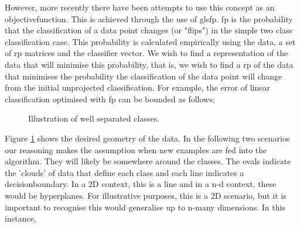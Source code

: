 However, more recently there have been attempts to use this concept as an \gls{objectivefunction}. This is achieved through the use of gls{fp}. \gls{fp} is the probability that the classification of a data point changes (or "flips") in the simple two class classification case. This probability is calculated empirically using the data, a set of \gls{rp} matrices and the classifier vector. We wish to find a representation of the data that will minimise this probability, that is, we wish to find a \gls{rp} of the data that minimises the probability the classification of the data point will change from the initial unprojected classification.  For example, the error of linear classification optimised with \gls{fp} can be bounded as follows;

\begin{figure}[ht]
\caption{Illustration of well separated classes.} 
\label{fig:good_sep_classes} %
\end{figure}

Figure \ref{fig:good_sep_classes} shows the desired geometry of the data. In the following two scenarios our reasoning makes the assumption when new examples are fed into the algorithm. They will likely be somewhere around the classes. The ovals indicate the 'clouds' of data that define each class and each line indicates a \gls{decisionboundary}. In a 2D context, this is a line and in a n-d context, these would be \gls{hyperplane}s.  For illustrative purposes, this is a 2D scenario, but it is important to recognise this would generalise up to n-many dimensions.  In this instance, 

